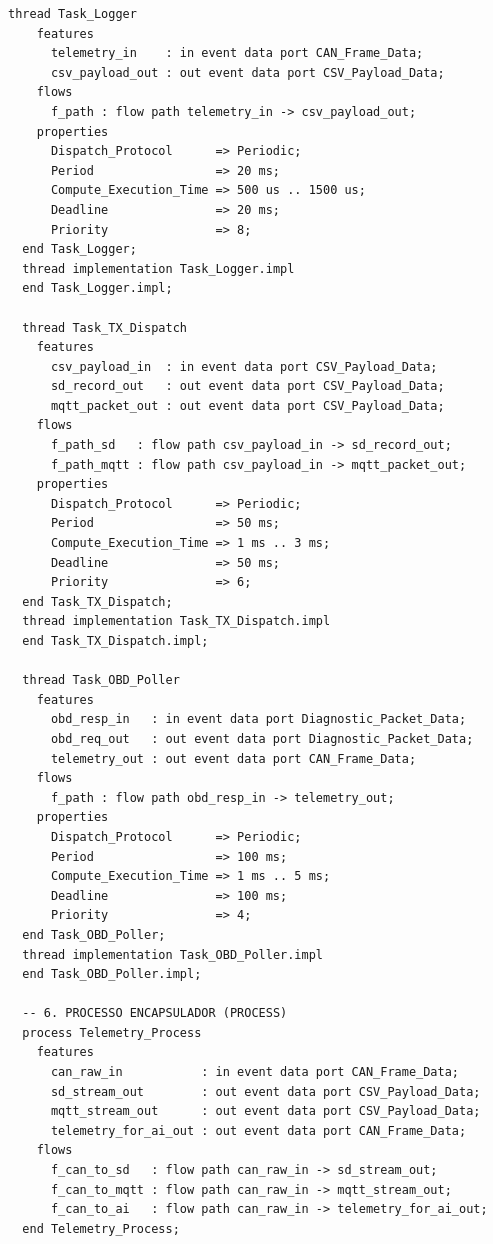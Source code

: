\begin{lstlisting}[language=AADL, caption={Modelo textual AADL completo consolidado (\texttt{EdgeTelemetryLayer.aadl}).}]
  thread Task_Logger
    features
      telemetry_in    : in event data port CAN_Frame_Data;
      csv_payload_out : out event data port CSV_Payload_Data;
    flows
      f_path : flow path telemetry_in -> csv_payload_out;
    properties
      Dispatch_Protocol      => Periodic;
      Period                 => 20 ms;
      Compute_Execution_Time => 500 us .. 1500 us;
      Deadline               => 20 ms;
      Priority               => 8;
  end Task_Logger;
  thread implementation Task_Logger.impl
  end Task_Logger.impl;

  thread Task_TX_Dispatch
    features
      csv_payload_in  : in event data port CSV_Payload_Data;
      sd_record_out   : out event data port CSV_Payload_Data;
      mqtt_packet_out : out event data port CSV_Payload_Data;
    flows
      f_path_sd   : flow path csv_payload_in -> sd_record_out;
      f_path_mqtt : flow path csv_payload_in -> mqtt_packet_out;
    properties
      Dispatch_Protocol      => Periodic;
      Period                 => 50 ms;
      Compute_Execution_Time => 1 ms .. 3 ms;
      Deadline               => 50 ms;
      Priority               => 6;
  end Task_TX_Dispatch;
  thread implementation Task_TX_Dispatch.impl
  end Task_TX_Dispatch.impl;

  thread Task_OBD_Poller
    features
      obd_resp_in   : in event data port Diagnostic_Packet_Data;
      obd_req_out   : out event data port Diagnostic_Packet_Data;
      telemetry_out : out event data port CAN_Frame_Data;
    flows
      f_path : flow path obd_resp_in -> telemetry_out;
    properties
      Dispatch_Protocol      => Periodic;
      Period                 => 100 ms;
      Compute_Execution_Time => 1 ms .. 5 ms;
      Deadline               => 100 ms;
      Priority               => 4;
  end Task_OBD_Poller;
  thread implementation Task_OBD_Poller.impl
  end Task_OBD_Poller.impl;

  -- 6. PROCESSO ENCAPSULADOR (PROCESS)
  process Telemetry_Process
    features
      can_raw_in           : in event data port CAN_Frame_Data;
      sd_stream_out        : out event data port CSV_Payload_Data;
      mqtt_stream_out      : out event data port CSV_Payload_Data;
      telemetry_for_ai_out : out event data port CAN_Frame_Data;
    flows
      f_can_to_sd   : flow path can_raw_in -> sd_stream_out;
      f_can_to_mqtt : flow path can_raw_in -> mqtt_stream_out;
      f_can_to_ai   : flow path can_raw_in -> telemetry_for_ai_out;
  end Telemetry_Process;


\end{lstlisting}
